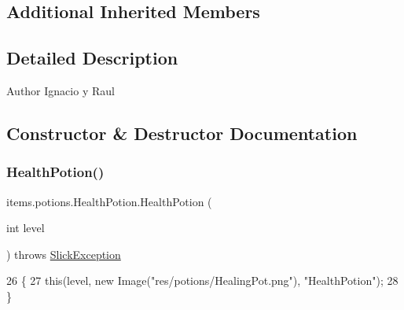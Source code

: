 \subsection*{Additional Inherited Members}


\subsection{Detailed Description}
\begin{DoxyAuthor}{Author}
Ignacio y Raul 
\end{DoxyAuthor}


\subsection{Constructor \& Destructor Documentation}
\mbox{\label{classitems_1_1potions_1_1_health_potion_aa30dccefeb52e5252ca039caa75d0f5b}} 
\subsubsection{\texorpdfstring{Health\+Potion()}{HealthPotion()}\hspace{0.1cm}{\footnotesize\ttfamily [1/2]}}
{\footnotesize\ttfamily items.\+potions.\+Health\+Potion.\+Health\+Potion (\begin{DoxyParamCaption}\item[{int}]{level }\end{DoxyParamCaption}) throws \mbox{\hyperlink{classorg_1_1newdawn_1_1slick_1_1_slick_exception}{Slick\+Exception}}\hspace{0.3cm}{\ttfamily [inline]}}


\begin{DoxyCode}
26                                                          \{
27         \textcolor{keyword}{this}(level, \textcolor{keyword}{new} Image(\textcolor{stringliteral}{"res/potions/HealingPot.png"}), \textcolor{stringliteral}{"HealthPotion"});
28     \}
\end{DoxyCode}
\mbox{\label{classitems_1_1potions_1_1_health_potion_a97a24952f4c52ebdf37662bbd7f785a7}} 
